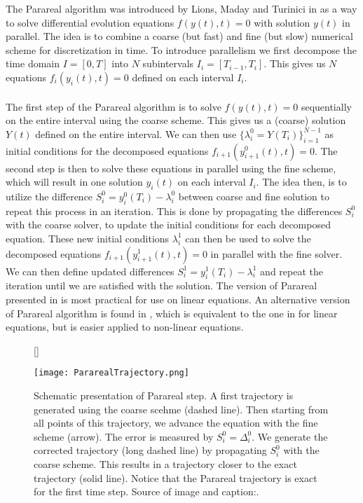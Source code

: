 The Parareal algorithm was introduced by Lions, Maday and Turinici in \cite{lions2001resolution} as a way to solve differential evolution equations $f(y(t),t)=0$ with solution $y(t)$ in parallel. The idea is to combine a coarse (but fast) and fine (but slow) numerical scheme for discretization in time. To introduce parallelism we first decompose the time domain $I=[0,T]$ into $N$ subintervals $I_i=[T_{i-1},T_i]$. This gives us $N$ equations $f_i(y_i(t),t)=0$ defined on each interval $I_i$. 
\\
\\
The first step of the Parareal algorithm is to solve $f(y(t),t)=0$ sequentially on the entire interval using the coarse scheme. This gives us a (coarse) solution $Y(t)$ defined on the entire interval. We can then use $\{\lambda_i^0=Y(T_i)\}_{i=1}^{N-1}$ as initial conditions for the decomposed equations $f_{i+1}(y_{i+1}^0(t),t)=0$. The second step is then to solve these equations in parallel using the fine scheme, which will result in one solution $y_i(t)$ on each interval $I_i$. The idea then, is to utilize the difference $S_i^0=y_i^0(T_{i})-\lambda_i^0$ between coarse and fine solution to repeat this process in an iteration. This is done by propagating the differences $S_i^0$ with the coarse solver, to update the initial conditions for each decomposed equation. These new initial conditions $\lambda_i^1$ can then be used to solve the decomposed equations $f_{i+1}(y_{i+1}^1(t),t)=0$ in parallel with the fine solver. We can then define updated differences $S_i^1=y_i^1(T_{i})-\lambda_i^1$ and repeat the iteration until we are satisfied with the solution. The version of Parareal presented in \cite{lions2001resolution} is most practical for use on linear equations. An alternative version of Parareal algorithm is found in \cite{baffico2002parallel}, which is equivalent to the one in \cite{lions2001resolution} for linear equations, but is easier applied to non-linear equations.
\\
\begin{figure}[h!]
[\FBwidth]
{\caption{Schematic presentation of Parareal step. A first trajectory is generated using the coarse scehme (dashed line). Then starting from all points of this trajectory, we advance the equation with the fine scheme (arrow). The error is measured by $S^0_i=\Delta^0_i$. We generate the corrected trajectory (long dashed line) by propagating $S^0_i$ with the coarse scheme. This results in a trajectory closer to the exact trajectory (solid line). Notice that the Parareal trajectory is exact for the first time step. Source of image and caption:\cite{baffico2002parallel}.}\label{trajectory_fig}}
{\texttt{[image: PararealTrajectory.png]}}
\end{figure}
